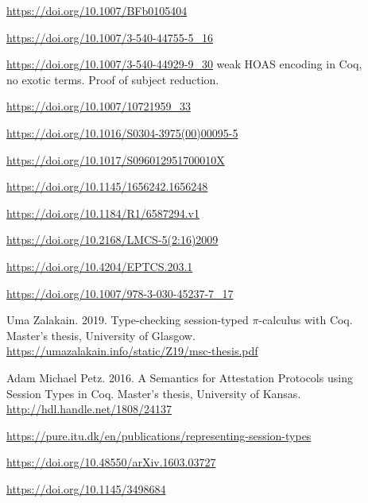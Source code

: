 \begin{description}
\item[\cite{Gordon1996}]                  \url{https://doi.org/10.1007/BFb0105404}
\item[\cite{Gay2001}]                     \url{https://doi.org/10.1007/3-540-44755-5_16}
\item[\cite{Despeyroux2000}]              \url{https://doi.org/10.1007/3-540-44929-9_30}
  weak HOAS encoding in Coq, no exotic terms. Proof of subject reduction.
\item[\cite{Gillard2000}]                 \url{https://doi.org/10.1007/10721959_33}
\item[\cite{Honsell2001}]                 \url{https://doi.org/10.1016/S0304-3975(00)00095-5}
\item[\cite{Perera2018}]                  \url{https://doi.org/10.1017/S096012951700010X}
\item[\cite{Tiu2010}]                     \url{https://doi.org/10.1145/1656242.1656248}
\item[\cite{Cervesato2007}]               \url{https://doi.org/10.1184/R1/6587294.v1}
\item[\cite{Bengtson2009}]                \url{https://doi.org/10.2168/LMCS-5(2:16)2009}
\item[\cite{Orchard2016}]                 \url{https://doi.org/10.4204/EPTCS.203.1}
\item[\cite{Castro2020}]                  \url{https://doi.org/10.1007/978-3-030-45237-7_17}
\item[\cite{Zalakain2019}]                Uma Zalakain. 2019. Type-checking session-typed $\pi$-calculus with Coq. Master's thesis, University of Glasgow. \url{https://umazalakain.info/static/Z19/msc-thesis.pdf}
\item[\cite{Petz2016}]                    Adam Michael Petz. 2016. A Semantics for Attestation Protocols using Session Types in Coq. Master's thesis, University of Kansas. \url{http://hdl.handle.net/1808/24137}
\item[\cite{Bock2016}]                    \url{https://pure.itu.dk/en/publications/representing-session-types}
\item[\cite{Xi2016}]                      \url{https://doi.org/10.48550/arXiv.1603.03727}
\item[\cite{Hirsch2022}]                  \url{https://doi.org/10.1145/3498684}

\end{description}
